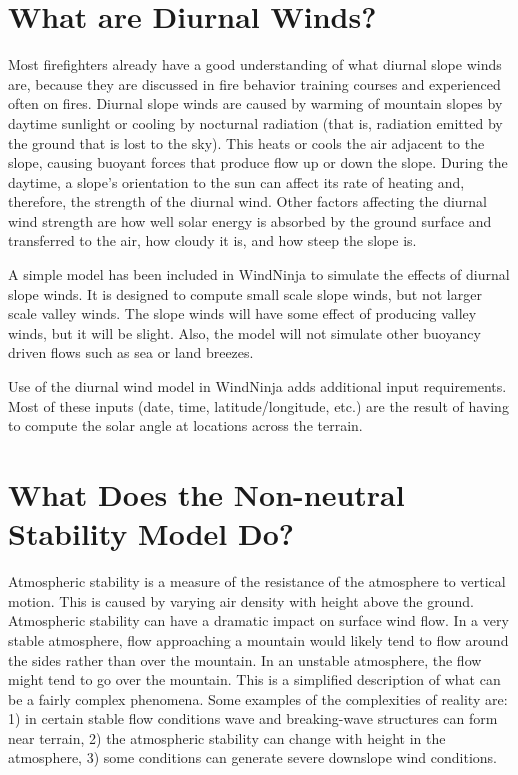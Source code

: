 \documentclass[12pt]{article}
\begin{document}
\section*{What are Diurnal Winds?}

Most firefighters already have a good understanding of what diurnal slope winds are, because they are discussed in fire behavior training courses and experienced often on fires.  Diurnal slope winds are caused by warming of mountain slopes by daytime sunlight or cooling by nocturnal radiation (that is, radiation emitted by the  ground that is lost to the  sky).  This heats or cools the air adjacent to the slope, causing buoyant forces that produce flow up or down the slope.  During the daytime, a slope’s orientation to the sun can affect its rate of heating and, therefore, the strength of the diurnal wind.  Other factors affecting the diurnal wind strength are how well solar energy is absorbed by the ground surface and transferred to the air, how cloudy it is, and how steep the slope is.

A simple model has been included in WindNinja to simulate the effects of diurnal slope winds.  It is designed to compute small scale slope winds, but not larger scale valley winds.  The slope winds will have some effect of producing valley winds, but it will be slight.  Also, the model will not simulate other buoyancy driven flows such as sea or land breezes.

Use of the diurnal wind model in WindNinja adds additional input requirements.  Most of these inputs (date, time, latitude/longitude, etc.) are the result of having to compute the solar angle at locations across the terrain.

\section*{What Does the Non-neutral Stability Model Do?}

Atmospheric stability is a measure of the resistance of the atmosphere to vertical motion.  This is caused by varying air density with height above the ground.  Atmospheric stability can have a dramatic impact on surface wind flow.  In a very stable atmosphere, flow approaching a mountain would likely tend to flow around the sides rather than over the mountain.  In an unstable atmosphere, the flow might tend to go over the mountain.  This is a simplified description of what can be a fairly complex phenomena.  Some examples of the complexities of reality are:  1) in certain stable flow conditions wave and breaking-wave structures can form near terrain, 2) the atmospheric stability can change with height in the atmosphere, 3) some conditions can generate severe downslope wind conditions.
\end{document}

